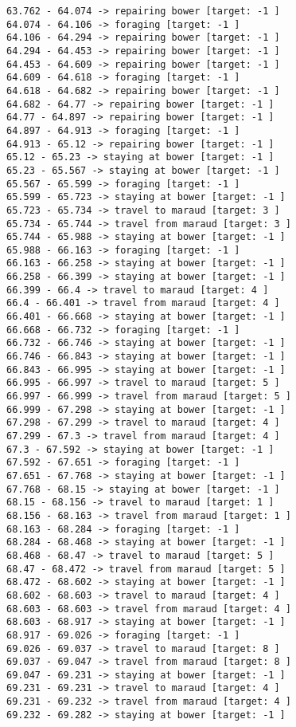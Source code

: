 \documentclass[11pt]{article}
\begin{document}
\begin{Verbatim}[commandchars=\\\{\}]
63.762 - 64.074 -> repairing bower [target: -1 ]
64.074 - 64.106 -> foraging [target: -1 ]
64.106 - 64.294 -> repairing bower [target: -1 ]
64.294 - 64.453 -> repairing bower [target: -1 ]
64.453 - 64.609 -> repairing bower [target: -1 ]
64.609 - 64.618 -> foraging [target: -1 ]
64.618 - 64.682 -> repairing bower [target: -1 ]
64.682 - 64.77 -> repairing bower [target: -1 ]
64.77 - 64.897 -> repairing bower [target: -1 ]
64.897 - 64.913 -> foraging [target: -1 ]
64.913 - 65.12 -> repairing bower [target: -1 ]
65.12 - 65.23 -> staying at bower [target: -1 ]
65.23 - 65.567 -> staying at bower [target: -1 ]
65.567 - 65.599 -> foraging [target: -1 ]
65.599 - 65.723 -> staying at bower [target: -1 ]
65.723 - 65.734 -> travel to maraud [target: 3 ]
65.734 - 65.744 -> travel from maraud [target: 3 ]
65.744 - 65.988 -> staying at bower [target: -1 ]
65.988 - 66.163 -> foraging [target: -1 ]
66.163 - 66.258 -> staying at bower [target: -1 ]
66.258 - 66.399 -> staying at bower [target: -1 ]
66.399 - 66.4 -> travel to maraud [target: 4 ]
66.4 - 66.401 -> travel from maraud [target: 4 ]
66.401 - 66.668 -> staying at bower [target: -1 ]
66.668 - 66.732 -> foraging [target: -1 ]
66.732 - 66.746 -> staying at bower [target: -1 ]
66.746 - 66.843 -> staying at bower [target: -1 ]
66.843 - 66.995 -> staying at bower [target: -1 ]
66.995 - 66.997 -> travel to maraud [target: 5 ]
66.997 - 66.999 -> travel from maraud [target: 5 ]
66.999 - 67.298 -> staying at bower [target: -1 ]
67.298 - 67.299 -> travel to maraud [target: 4 ]
67.299 - 67.3 -> travel from maraud [target: 4 ]
67.3 - 67.592 -> staying at bower [target: -1 ]
67.592 - 67.651 -> foraging [target: -1 ]
67.651 - 67.768 -> staying at bower [target: -1 ]
67.768 - 68.15 -> staying at bower [target: -1 ]
68.15 - 68.156 -> travel to maraud [target: 1 ]
68.156 - 68.163 -> travel from maraud [target: 1 ]
68.163 - 68.284 -> foraging [target: -1 ]
68.284 - 68.468 -> staying at bower [target: -1 ]
68.468 - 68.47 -> travel to maraud [target: 5 ]
68.47 - 68.472 -> travel from maraud [target: 5 ]
68.472 - 68.602 -> staying at bower [target: -1 ]
68.602 - 68.603 -> travel to maraud [target: 4 ]
68.603 - 68.603 -> travel from maraud [target: 4 ]
68.603 - 68.917 -> staying at bower [target: -1 ]
68.917 - 69.026 -> foraging [target: -1 ]
69.026 - 69.037 -> travel to maraud [target: 8 ]
69.037 - 69.047 -> travel from maraud [target: 8 ]
69.047 - 69.231 -> staying at bower [target: -1 ]
69.231 - 69.231 -> travel to maraud [target: 4 ]
69.231 - 69.232 -> travel from maraud [target: 4 ]
69.232 - 69.282 -> staying at bower [target: -1 ]

\end{Verbatim}
\end{document}
